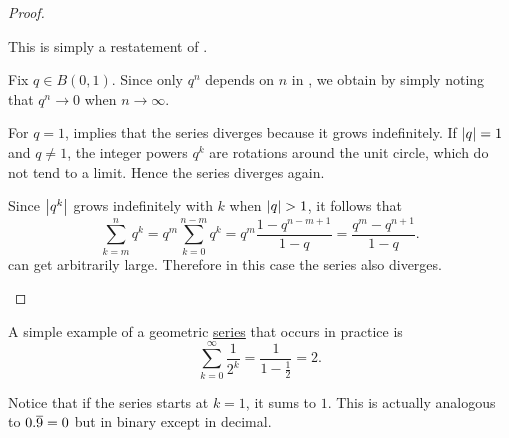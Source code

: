 \begin{proof}\mbox{}
  \begin{description}
     This is simply a restatement of .

     Fix \( q \in B(0, 1) \). Since only \( q^n \) depends on \( n \) in , we obtain  by simply noting that \( q^n \to 0 \) when \( n \to \infty \).

     For \( q = 1 \),  implies that the series diverges because it grows indefinitely. If \( \left\vert q \right\vert = 1 \) and \( q \neq 1 \), the integer powers \( q^k \) are rotations around the unit circle, which do not tend to a limit. Hence the series diverges again.

    Since \( \left\vert q^k \right\vert \) grows indefinitely with \( k \) when \( \left\vert q \right\vert > 1 \), it follows that
    \begin{equation*}\label{thm:geometric_progression/cauchy_partial_sum}
      \sum_{k=m}^n q^k
      =
      q^m \sum_{k=0}^{n-m} q^k
      =
      q^m \frac {1 - q^{n-m+1}} {1 - q}
      =
      \frac {q^m - q^{n+1}} {1 - q}.
    \end{equation*}
    can get arbitrarily large. Therefore in this case the series also diverges.
  \end{description}
\end{proof}

\begin{example}\label{ex:series_of_reciprocal_powers_of_two}
  A simple example of a geometric \hyperref[def:geometric_progression/series]{series} that occurs in practice is
  \begin{equation}\label{ex:series_of_reciprocal_powers_of_two/series}
    \sum_{k=0}^\infty \frac 1 {2^k} = \frac 1 {1 - \frac 1 2} = 2.
  \end{equation}

  Notice that if the series starts at \( k = 1 \), it sums to \( 1 \). This is actually analogous to \( 0.\overline{9} = 0 \) but in binary except in decimal.
\end{example}

